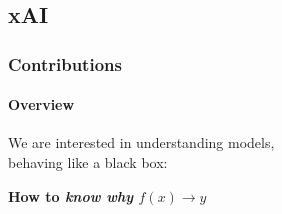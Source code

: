 \subsection*{xAI}
\begin{frame}[t]
    \frametitle{Contributions}
    \framesubtitle{Overview}
    \small
    We are interested in understanding models,\\
    behaving like a black box:\\\vspace{-10pt}
    \begin{center}
        
        \pause
        \textbf{How to \emph{know why} $f(x)\rightarrow y$}\\
    \end{center}
    \pause
    \vspace{-20pt}
    
\end{frame}
